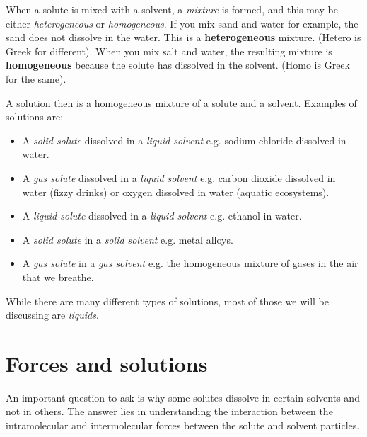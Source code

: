 When a solute is mixed with a solvent, a \textit{mixture} is formed, and this may be either \textit{heterogeneous} or \textit{homogeneous}. If you mix sand and water for example, the sand does not dissolve in the water. This is a \textbf{heterogeneous} mixture. (Hetero is Greek for different). When you mix salt and water, the resulting mixture is \textbf{homogeneous} because the solute has dissolved in the solvent. (Homo is Greek for the same). \\


A solution then is a homogeneous mixture of a solute and a solvent. Examples of solutions are:

\begin{itemize}
\item{A \textit{solid solute} dissolved in a \textit{liquid solvent} e.g. sodium chloride dissolved in water.}
\item{A \textit{gas solute} dissolved in a \textit{liquid solvent} e.g. carbon dioxide dissolved in water (fizzy drinks) or oxygen dissolved in water (aquatic ecosystems).}
\item{A \textit{liquid solute} dissolved in a \textit{liquid solvent} e.g. ethanol in water.}
\item{A \textit{solid solute} in a \textit{solid solvent} e.g. metal alloys.}
\item{A \textit{gas solute} in a \textit{gas solvent} e.g. the homogeneous mixture of gases in the air that we breathe.}
\end{itemize}

While there are many different types of solutions, most of those we will  be discussing are \textit{liquids}.\\

\section{Forces and solutions}
\label{sec:soln:forces}

An important question to ask is why some solutes dissolve in certain solvents and not in others. The answer lies in understanding the interaction between the intramolecular and intermolecular forces between the solute and solvent particles. 

